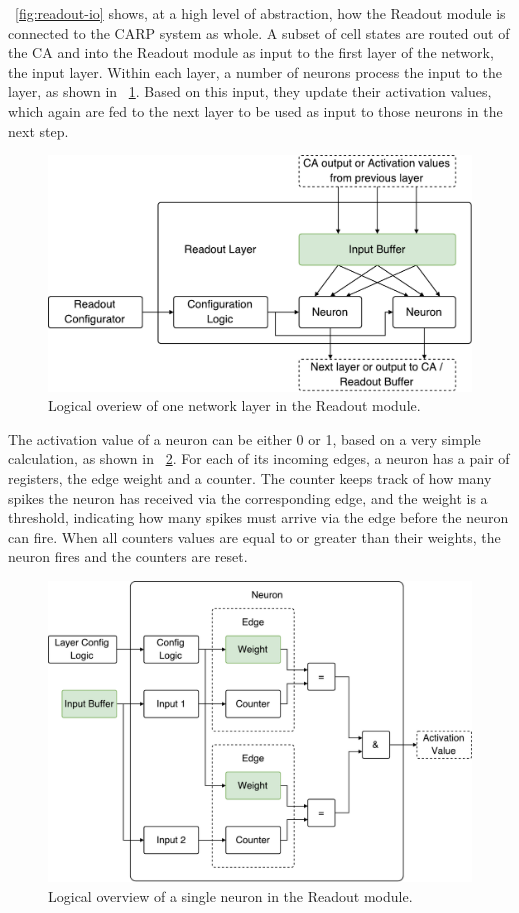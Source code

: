 \figurename~\ref{fig:readout-io} shows, at a high level of abstraction, how the
Readout module is connected to the CARP system as whole. A subset of cell states
are routed out of the CA and into the Readout module as input to the first layer
of the network, the input layer. Within each layer, a number of neurons process
the input to the layer, as shown in \figurename~\ref{fig:readout-layer}. Based
on this input, they update their activation values, which again are fed to the
next layer to be used as input to those neurons in the next step.

\begin{figure}[ht]
  \centering
  \includegraphics[width=0.8\linewidth]{fig/readout-layer}
  \caption[Network Layer]{Logical overiew of one network layer in the Readout module.}
  \label{fig:readout-layer}
\end{figure}

The activation value of a neuron can be either 0 or 1, based on a very simple
calculation, as shown in \figurename~\ref{fig:readout-neuron}. For each of its
incoming edges, a neuron has a pair of registers, the edge weight and a counter.
The counter keeps track of how many spikes the neuron has received via the
corresponding edge, and the weight is a threshold, indicating how many spikes
must arrive via the edge before the neuron can fire. When all counters values
are equal to or greater than their weights, the neuron fires and the counters
are reset.

\begin{figure}[ht]
  \centering
  \includegraphics[width=0.8\linewidth]{fig/readout-neuron}
  \caption[Neuron]{Logical overview of a single neuron in the Readout module.}
  \label{fig:readout-neuron}
\end{figure}

